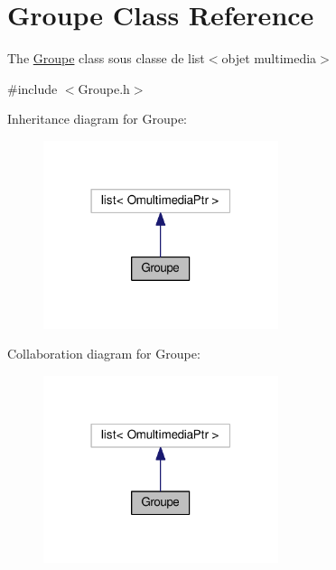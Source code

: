 \hypertarget{class_groupe}{\section{Groupe Class Reference}
\label{class_groupe}
}


The \hyperlink{class_groupe}{Groupe} class sous classe de list$<$objet multimedia$>$  




{\ttfamily \#include $<$Groupe.\+h$>$}



Inheritance diagram for Groupe\+:
\nopagebreak
\begin{figure}[H]
\begin{center}
\leavevmode
\includegraphics[width=195pt]{class_groupe__inherit__graph}
\end{center}
\end{figure}


Collaboration diagram for Groupe\+:
\nopagebreak
\begin{figure}[H]
\begin{center}
\leavevmode
\includegraphics[width=195pt]{class_groupe__coll__graph}
\end{center}
\end{figure}
